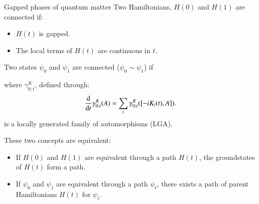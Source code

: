 \documentclass{beamer}
\begin{document}
\begin{frame}{Gapped phases of quantum matter}
	Two Hamiltonians, $H(0)$ and $H(1)$ are connected if:
	\begin{center}
	\end{center}
	\begin{itemize}
		\item<2-> $H(t)$ is gapped.
		\item<3-> The local terms of $H(t)$ are continuous in $t$.
	\end{itemize}
	
\end{frame}

\begin{frame}
	Two states $\psi_0$ and $\psi_1$ are connected ($\psi_0\sim\psi_1$) if
	\begin{center}
	\end{center}
	where $\gamma^K_{0;t}$, defined through:
	\[\frac{\textrm{d}}{\textrm{d} t}\gamma_{0;t}^K(A)=\sum_i \gamma_{0;t}^K([-iK_i(t),A]).\]
	is a locally generated family of automorphisms (LGA).
\end{frame}

\begin{frame}
	These two concepts are equivalent:
	\begin{itemize}
		\item<2-> If $H(0)$ and $H(1)$ are equivalent through a path $H(t)$, the groundstates of $H(t)$ form a path.
		\item<3-> If $\psi_0$ and $\psi_1$ are equivalent through a path $\psi_t$, there exists a path of parent Hamiltonians $H(t)$ for $\psi_t$.
	\end{itemize}
\end{frame}
\end{document}
